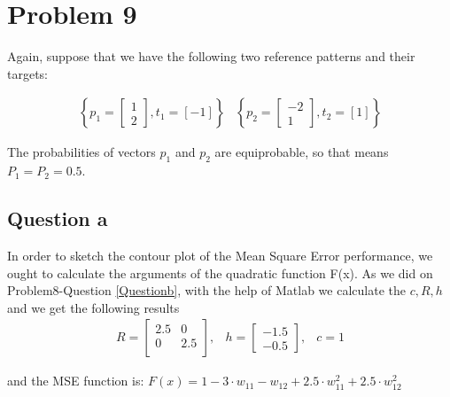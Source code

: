 

\section{Problem 9}
Again, suppose that we have the following two reference patterns and their targets:
\vspace{5mm}

\[
\begin{array}{ccc}
	\left\{ 
	p_1 = \left[
	\begin{array}{c}
		1 \\
		2
	\end{array}
	\right], t_1 = \left[-1\right]
	\right\} & 
	\left\{ 
	p_2 = \left[
	\begin{array}{c}
		-2 \\
		1
	\end{array}
	\right], t_2 = \left[1\right]
	\right\}
\end{array}
\]
\vspace{5mm}

The probabilities of vectors $p_1$ and $p_2$ are equiprobable, so that means $P_1 = P_2 = 0.5$.

\subsection{Question a}
In order to sketch the contour plot of the Mean Square Error performance, we ought to calculate the arguments of the quadratic function F(x). As we did on Problem8-Question \ref{Questionb}, with the help of Matlab we calculate the $c,R,h$ and we get the following results\\
\[
\begin{array}{ccc}
R = \left[
\begin{array}{cc}
	2.5 & 0 \\
	0 & 2.5 \\
\end{array}
\right], & 
h = \left[
\begin{array}{c}
	-1.5 \\
	-0.5
\end{array}
\right], & c = 1
\end{array}
\]

and the MSE function is:
$F(x) = 1 - 3 \cdot w_{11} -w_{12} + 2.5 \cdot w_{11}^2 + 2.5 \cdot w_{12}^2$ \\

